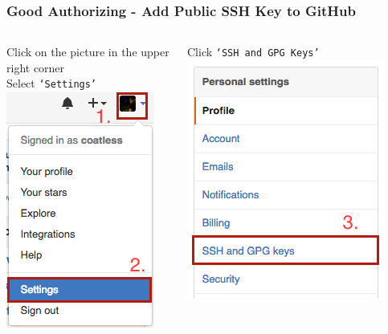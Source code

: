 \documentclass{beamer}\usepackage[]{graphicx}\usepackage[]{color}
\begin{document}
\begin{frame}[fragile]
\frametitle{Good Authorizing - Add Public SSH Key to GitHub}

\begin{columns}[t]
\centering
\begin{block}{Click on the picture in the upper right corner \\ Select \texttt{`Settings'}}
\centering
\includegraphics[scale=0.5]{img/ssh/github_settings_menu.png}
\end{block}
\centering
\begin{block}{Click \texttt{`SSH and GPG Keys'}}
\centering
\includegraphics[scale=0.4]{img/ssh/github_profile_menu.png}
\end{block}
\end{columns}

\end{frame}
\end{document}
